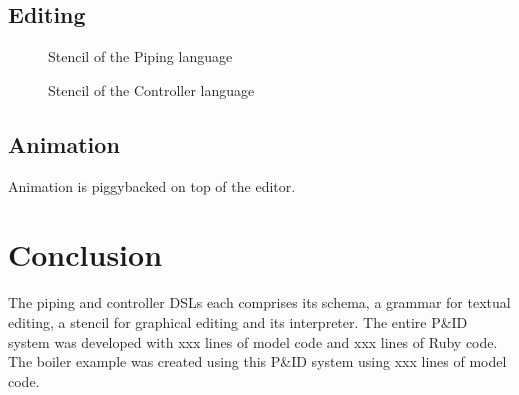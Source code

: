 \documentclass[11pt]{article}
\newcommand{\comments}[1]{}
\begin{document}
\subsection{Editing}


\begin{figure}
\caption{Stencil of the Piping language}
\label{piping-stencil}
\end{figure}

\begin{figure}
\caption{Stencil of the Controller language}
\label{controller-stencil}
\end{figure}

\subsection{Animation}

Animation is piggybacked on top of the editor.

\section{Conclusion}

\comments{
- SLOC
- Dev time
- 
}

The piping and controller DSLs each comprises its schema, a grammar for textual editing, a stencil for graphical editing and its interpreter. The entire P\&ID system was developed with xxx lines of model code and xxx lines of Ruby code. The boiler example was created using this P\&ID system using xxx lines of model code.
\end{document}
